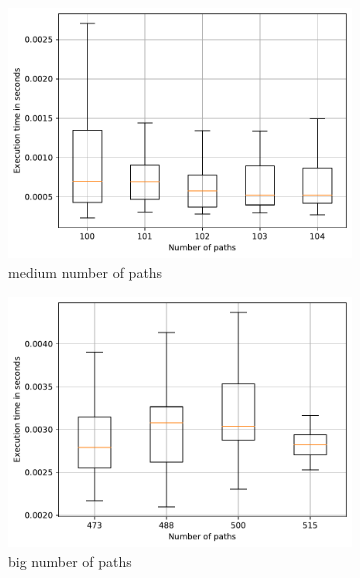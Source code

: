 \begin{figure}
	\begin{subfigure}{0.32\textwidth}
		\includegraphics[width=\linewidth,trim=0 0 -1.5cm 0]{pictures/allMatr_go_10_big.pdf}
		\caption{medium number of paths} \label{fig:extractTimeGoMedMtx}
	\end{subfigure}
	\hspace*{\fill}
	\begin{subfigure}{0.32\textwidth}
		\includegraphics[width=\linewidth,trim=0 0 -1.5cm 0]{pictures/go_50_matrixall.pdf}
		\caption{big number of paths} \label{fig:extractTimeGoBigMtx}
	\end{subfigure}
	\hspace*{\fill} %
	\begin{subfigure}{0.32\textwidth}

\end{subfigure}
\end{figure}
